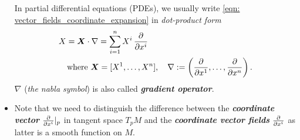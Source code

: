\documentclass[11pt]{article}
\begin{document}
\begin{itemize}
\begin{remark}
In partial differential equations (PDEs), we usually write \eqref{eqn: vector_fields_coordinate_expansion} in \emph{dot-product form}
\begin{align}
&X = \boldsymbol{X} \cdot \nabla = \sum_{i=1}^{n}X^{i}\,\frac{\partial }{ \partial x^{i}} \label{eqn: vector_fields_coordinate_dot_product}\\
&\quad \text{where }\boldsymbol{X} = [X^{1}, \ldots, X^{n}], \quad \nabla := \left(\frac{\partial }{ \partial x^{1}}, \ldots, \frac{\partial }{ \partial x^{n}}\right).  \nonumber
\end{align} $\nabla$ (\emph{the nabla symbol}) is also called \emph{\textbf{gradient operator}}.
\end{remark}

\item Note that we need to distinguish the difference between the \emph{\textbf{coordinate vector}} $\frac{\partial }{ \partial x^{i}}|_{p}$ in tangent space $T_{p}M$ and the \emph{\textbf{coordinate vector fields}} $\frac{\partial }{ \partial x^{i}}$ as latter is a smooth function on $M$. 
\end{itemize}
\end{document}
